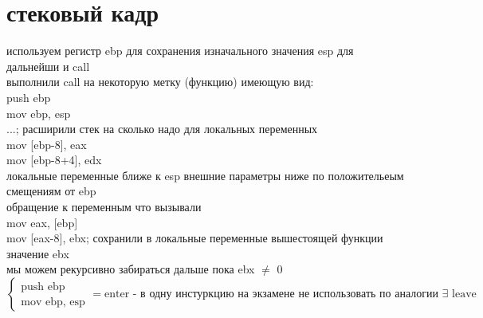 \documentclass[a4paper, 12pt]{article}
\begin{document}
    \section*{стековый кадр}
    \hypertarget{stack_add}{}
    используем регистр ebp для сохранения изначального значения esp для дальнейши и call \\
    выполнили call на некоторую метку (функцию) имеющую вид: \\
    push ebp\\
    mov ebp, esp \\
    ...;  расширили стек на сколько надо для локальных переменных \\
    mov [ebp-8], eax \\
    mov [ebp-8+4], edx \\ локальные переменные ближе к esp внешние параметры ниже по положительеым смещениям от ebp
    \\
    обращение к переменным что вызывали \\
    mov eax, [ebp] \\
    mov [eax-8], ebx; сохранили в локальные переменные вышестоящей функции значение ebx \\
    мы можем рекурсивно забираться дальше пока ebx $\ne$ 0 \\

    \[
    \begin{cases}
        \text{push ebp}\\
        \text{mov ebp, esp}
    \end{cases} = \text{enter - в одну инстуркцию на экзамене не использовать по аналогии $\exists$ leave}
    \]
\end{document}
